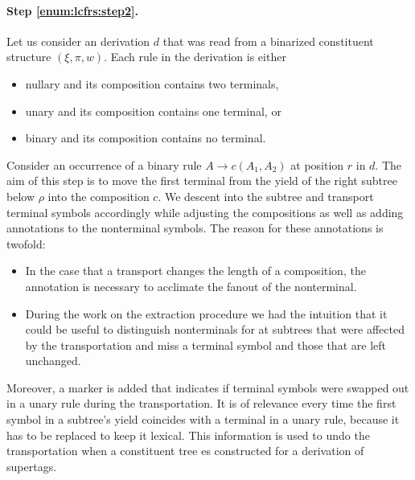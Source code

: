 \documentclass[../../document.tex]{subfiles}
\begin{document}
    \paragraph{Step \ref{enum:lcfrs:step2}.}
    Let us consider an  derivation \(d\) that was read from a binarized constituent structure \((\xi, \pi, w)\).
    Each rule in the derivation is either
    \begin{itemize}[nosep]
        \item nullary and its composition contains two terminals,
        \item unary and its composition contains one terminal, or
        \item binary and its composition contains no terminal.
    \end{itemize}
    Consider an occurrence of a binary rule $A \to c(A_1, A_2)$ at position \(r\) in \(d\).
    The aim of this step is to move the first terminal from the yield of the right subtree below \(\rho\) into the composition \(c\).
    We descent into the subtree and transport terminal symbols accordingly while adjusting the compositions as well as adding annotations to the nonterminal symbols.
    The reason for these annotations is twofold:
    \begin{itemize}[nosep]
        \item In the case that a transport changes the length of a composition, the annotation is necessary to acclimate the fanout of the  nonterminal.
        \item
            During the work on the extraction procedure we had the intuition that it could be useful to distinguish nonterminals for at subtrees that were affected by the transportation and miss a terminal symbol and those that are left unchanged.
    \end{itemize}
    Moreover, a marker is added that indicates if terminal symbols were swapped out in a unary rule during the transportation.
    It is of relevance every time the first symbol in a subtree's yield coincides with a terminal in a unary rule, because it has to be replaced to keep it lexical.
    This information is used to undo the transportation when a constituent tree es constructed for a derivation of supertags.
\end{document}
